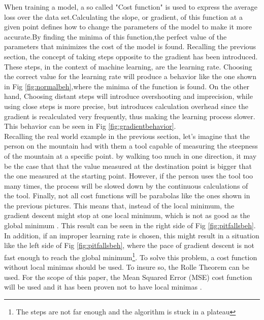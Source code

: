 \documentclass[conference]{IEEEtran}
\begin{document}
When training a model, a so called "Cost function" is used to express the average loss over the data set.Calculating the slope, or gradient, of this function at a given point defines how to change the parameters of the model to make it more accurate.By finding the minima of this function,the perfect value of the parameters that minimizes the cost of the model is found. 
Recalling the previous section, the concept of taking steps opposite to the gradient has been introduced. These steps, in the context of machine learning, are the learning rate.
Choosing the correct value for the learning rate will produce a behavior like the one shown in Fig \ref{fig:normalbeh},where the minima of the function is found. 
On the other hand, Choosing distant steps will introduce overshooting and imprecision, while using close steps is more precise, but introduces calculation overhead since the gradient is recalculated very frequently, thus making the learning process slower\cite{Scikit-Learn}. This behavior can be seen in Fig \ref{fig:gradientbehavior}.\\
Recalling the real world example in the previous section, let's imagine that the person on the mountain had with them a tool capable of measuring the steepness of the mountain at a specific point. by walking too much in one direction, it may be the case that that the value measured at the destination point is bigger that the one measured at the starting point. However, if the person uses the tool too many times, the process will be slowed down by the continuous calculations of the tool. 
Finally, not all cost functions will be parabolas like the ones shown in the previous pictures. This means that, instead of the local minimum, the gradient descent might stop at one local minimum, which is not as good as the global minimum \cite{Scikit-Learn}. This result can be seen in the right side of Fig \ref{fig:pitfallsbeh}. 
In addition, if an improper learning rate is chosen, this might result in a situation like the left side of Fig \ref{fig:pitfallsbeh}, where the pace of gradient descent is not fast enough to reach the global minimum\footnote{ The steps are not far enough and the algorithm is stuck in a plateau}.
To solve this problem, a cost function without local minimas should be used. To insure so, the Rolle Theorem can be used\cite{Roll}. For the scope of this paper, the Mean Squared Error (MSE) cost function will be used and it has been proven not to have local minimas
\cite{Scikit-Learn}.
\end{document}
